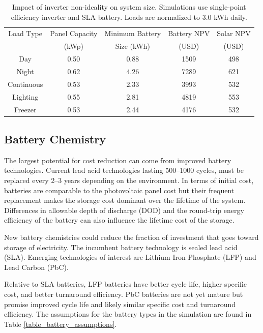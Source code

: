 \documentclass[conference]{IEEEtran}
\begin{document}
\begin{table}
\centering
\begin{tabular}{c c c c c}
Load Type     & Panel Capacity & Minimum Battery & Battery NPV & Solar NPV \\
              & (kWp)          & Size (kWh)      & (USD)       & (USD)     \\
\hline
Day        & 0.50 & 0.88 & 1509 & 498 \\
Night      & 0.62 & 4.26 & 7289 & 621 \\
Continuous & 0.53 & 2.33 & 3993 & 532 \\
Lighting   & 0.55 & 2.81 & 4819 & 553 \\
Freezer    & 0.53 & 2.44 & 4176 & 532 \\

\end{tabular}
\caption{Impact of inverter non-ideality on system size.  
Simulations use single-point efficiency inverter and 
SLA battery.
Loads are normalized to 3.0 kWh daily.}
\label{table_inverter}
\end{table}

\subsection{Battery Chemistry}

The largest potential for cost reduction can come from improved
battery technologies.
Current lead acid technologies lasting 500--1000 cycles, must be 
replaced every 2--3 years depending on the environment.
In terms of initial cost, batteries are comparable to the photovoltaic
panel cost but their frequent replacement makes the storage cost
dominant over the lifetime of the system.
Differences in allowable depth of discharge (DOD) and the round-trip
energy efficiency of the battery can also influence the lifetime
cost of the storage.

New battery chemistries could reduce the fraction of investment
that goes toward storage of electricity.
The incumbent battery technology is sealed lead acid (SLA).
Emerging technologies of interest are Lithium Iron Phosphate
(LFP) and Lead Carbon (PbC).

Relative to SLA batteries, LFP batteries
have better cycle life, higher specific cost, and better
turnaround efficiency.
PbC batteries are not yet mature but promise improved cycle
life and likely similar specific cost and turnaround
efficiency.
The assumptions for the battery types in the simulation
are found in Table \ref{table_battery_assumptions}.
\end{document}
